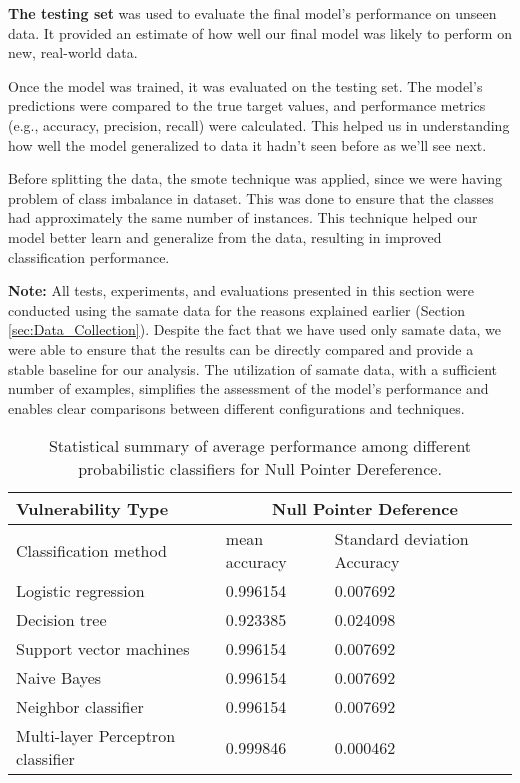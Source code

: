 \textbf{The testing set} was used to evaluate the final model's performance on unseen data. It provided an estimate of how well our final model was likely to perform on new, real-world data.

Once the model was trained, it was evaluated on the testing set. The model's predictions were compared to the true target values, and performance metrics (e.g., accuracy, precision, recall) were calculated. This helped us in understanding how well the model generalized to data it hadn't seen before as we'll see next.


Before splitting the data, the \gls{smote} technique was applied, since we were having problem of class imbalance in dataset. This was done to ensure that the classes had approximately the same number of instances. This technique helped our model better learn and generalize from the data, resulting in improved classification performance.


\textbf{Note:} All tests, experiments, and evaluations presented in this section were conducted using the \gls{samate} data for the reasons explained earlier (Section \ref{sec:Data_Collection}). Despite the fact that we have used only \gls{samate} data, we were able to ensure that the results can be directly compared and provide a stable baseline for our analysis. The utilization of \gls{samate} data, with a sufficient number of examples, simplifies the assessment of the model's performance and enables clear comparisons between different configurations and techniques.

\newpage

\begin{table}[!ht]
    \centering
    \caption{Statistical summary of average performance among different probabilistic classifiers for Null Pointer Dereference.}
    \begin{tabular}{|l|l|l|}
    \hline
        \textbf{Vulnerability Type} & \multicolumn{2}{|c|}{\textbf{Null Pointer Deference}} \\ \hline
        Classification method &  mean accuracy & Standard deviation Accuracy \\ \hline
        Logistic regression & 0.996154 & 0.007692 \\ \hline
        Decision tree & 0.923385 & 0.024098 \\ \hline
        Support vector machines & 0.996154 & 0.007692 \\ \hline
        Naive Bayes & 0.996154 & 0.007692 \\ \hline
        Neighbor classifier & 0.996154 & 0.007692 \\ \hline
        Multi-layer Perceptron classifier & 0.999846 & 0.000462 \\ \hline
    \end{tabular}
	\label{tab:results_probabilistic_classifiers_NPD}
\end{table}

